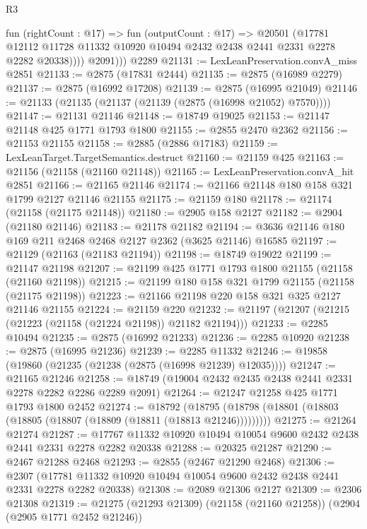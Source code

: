 \begin{lexlean}{R3}
\begin{coremodule}
            fun (rightCount : @17) =>
            fun (outputCount : @17) =>
            @20501
              (@17781
                @12112
                @11728
                @11332
                @10920
                @10494
                @2432
                @2438
                @2441
                @2331
                @2278
                @2282
                @20338))))
          @2091)))
    @2289
@21131 := LexLeanPreservation.convA_miss @2851
@21133 := @2875 (@17831 @2444)
@21135 := @2875 (@16989 @2279)
@21137 := @2875 (@16992 @17208)
@21139 := @2875 (@16995 @21049)
@21146 := @21133 (@21135 (@21137 (@21139 (@2875 (@16998 @21052) @7570))))
@21147 := @21131 @21146
@21148 := @18749 @19025
@21153 := @21147 @21148 @425 @1771 @1793 @1800
@21155 := @2855 @2470 @2362
@21156 := @21153 @21155
@21158 := @2885 (@2886 @17183)
@21159 := LexLeanTarget.TargetSemantics.destruct
@21160 := @21159 @425
@21163 := @21156 (@21158 (@21160 @21148))
@21165 := LexLeanPreservation.convA_hit @2851
@21166 := @21165 @21146
@21174 := @21166 @21148 @180 @158 @321 @1799 @2127 @21146 @21155
@21175 := @21159 @180
@21178 := @21174 (@21158 (@21175 @21148))
@21180 := @2905 @158 @2127
@21182 := @2904 (@21180 @21146)
@21183 := @21178 @21182
@21194 := @3636 @21146 @180 @169 @211 @2468 @2468 @2127 @2362 (@3625 @21146) @16585
@21197 := @21129 (@21163 (@21183 @21194))
@21198 := @18749 @19022
@21199 := @21147 @21198
@21207 := @21199 @425 @1771 @1793 @1800 @21155 (@21158 (@21160 @21198))
@21215 := @21199 @180 @158 @321 @1799 @21155 (@21158 (@21175 @21198))
@21223 := @21166 @21198 @220 @158 @321 @325 @2127 @21146 @21155
@21224 := @21159 @220
@21232 := @21197 (@21207 (@21215 (@21223 (@21158 (@21224 @21198)) @21182 @21194)))
@21233 := @2285 @10494
@21235 := @2875 (@16992 @21233)
@21236 := @2285 @10920
@21238 := @2875 (@16995 @21236)
@21239 := @2285 @11332
@21246 := @19858 (@19860 (@21235 (@21238 (@2875 (@16998 @21239) @12035))))
@21247 := @21165 @21246
@21258 := @18749 (@19004 @2432 @2435 @2438 @2441 @2331 @2278 @2282 @2286 @2289 @2091)
@21264 := @21247 @21258 @425 @1771 @1793 @1800 @2452
@21274 := @18792
    (@18795 (@18798 (@18801 (@18803 (@18805 (@18807 (@18809 (@18811 (@18813 @21246)))))))))
@21275 := @21264 @21274
@21287 := @17767 @11332 @10920 @10494 @10054 @9600 @2432 @2438 @2441 @2331 @2278 @2282 @20338
@21288 := @20325 @21287
@21290 := @2467 @21288 @2468
@21293 := @2855 (@2467 @21290 @2468)
@21306 := @2307
    (@17781 @11332 @10920 @10494 @10054 @9600 @2432 @2438 @2441 @2331 @2278 @2282 @20338)
@21308 := @2089 @21306 @2127
@21309 := @2306 @21308
@21319 := @21275 (@21293 @21309) (@21158 (@21160 @21258)) (@2904 (@2905 @1771 @2452 @21246))

\end{coremodule}
\end{lexlean}
